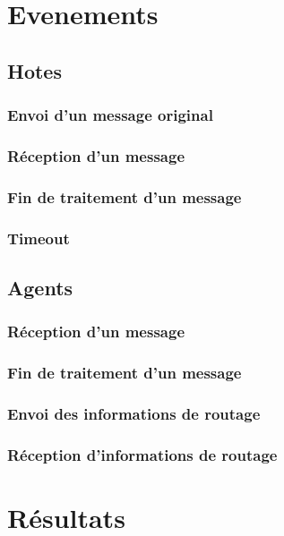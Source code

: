 \documentclass[a4paper,11pt]{article}
\begin{document}

\tableofcontents %
\pagebreak
\listoffigures %
\pagebreak


\section{Evenements}

\subsection{Hotes}
\subsubsection{Envoi d'un message original}
\subsubsection{Réception d'un message}
\subsubsection{Fin de traitement d'un message}
\subsubsection{Timeout}

\subsection{Agents}
\subsubsection{Réception d'un message}
\subsubsection{Fin de traitement d'un message}
\subsubsection{Envoi des informations de routage}
\subsubsection{Réception d'informations de routage}


\section{Résultats}
\end{document}

